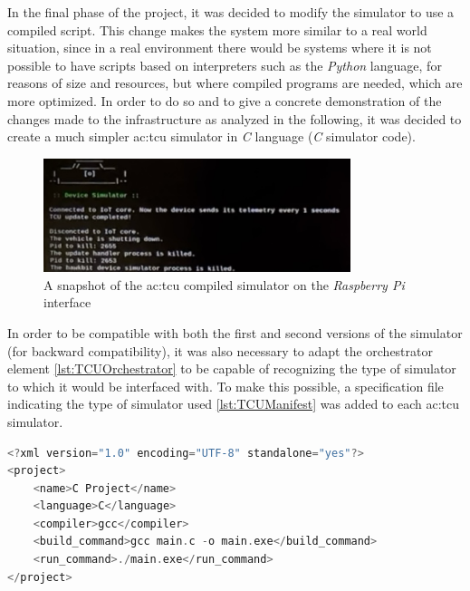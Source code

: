 In the final phase of the project, it was decided to modify the simulator to use a compiled script. This change makes the system more similar to a real world situation, since in a real environment there would be systems where it is not possible to have scripts based on interpreters such as the \textit{Python} language, for reasons of size and resources, but where compiled programs are needed, which are more optimized. In order to do so and to give a concrete demonstration of the changes made to the infrastructure as analyzed in the following, it was decided to create a much simpler \gls{ac:tcu} simulator in \textit{C} language (\textit{C} simulator code). 
\begin{figure}[h]  %
    \centering
    \includegraphics[width=0.8\textwidth]{images/TCUsimulatorC.png}  %
    \caption{A snapshot of the \gls{ac:tcu} compiled simulator on the \textit{Raspberry Pi} interface}
    \label{fig:TCUsimulatorC}
\end{figure}

In order to be compatible with both the first and second versions of the simulator (for backward compatibility), it was also necessary to adapt the orchestrator element \ref{lst:TCUOrchestrator} to be capable of recognizing the type of simulator to which it would be interfaced with. To make this possible, a specification file indicating the type of simulator used \ref{lst:TCUManifest} was added to each \gls{ac:tcu} simulator.
\begin{lstlisting}[language=c, caption={Manifest example of compiled \gls{ac:tcu} simulator}, label=lst:TCUManifest]
<?xml version="1.0" encoding="UTF-8" standalone="yes"?>
<project>
    <name>C Project</name>
    <language>C</language>
    <compiler>gcc</compiler>
    <build_command>gcc main.c -o main.exe</build_command>
    <run_command>./main.exe</run_command>
</project>
\end{lstlisting}

